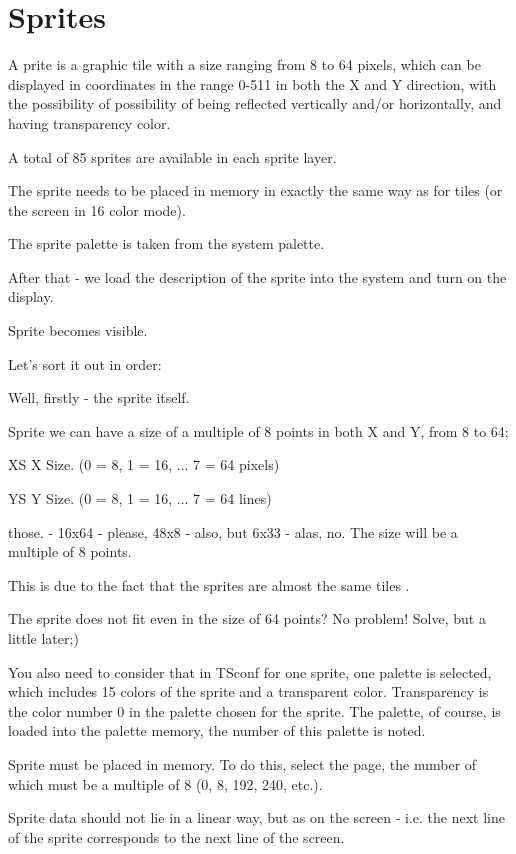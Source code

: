 \section{Sprites}

A prite is a graphic tile with a size ranging from 8 to 64 pixels,
which can be displayed in coordinates in the range 0-511 in both the X
and Y direction, with the possibility of possibility of being
reflected vertically and/or horizontally, and having transparency color.

A total of 85 sprites are available in each sprite layer.

The sprite needs to be placed in memory in exactly the same way as for
tiles (or the screen in 16 color mode).

The sprite palette is taken from the system palette.

After that - we load the description of the sprite into the system and
turn on the display.

Sprite becomes visible.

Let's sort it out in order: 

Well, firstly - the sprite itself. 

Sprite we can have a size of a multiple of 8 points in both X and Y,
from 8 to 64;

XS X Size. (0 = 8, 1 = 16, ... 7 = 64 pixels) 

YS Y Size. (0 = 8, 1 = 16, ... 7 = 64 lines)

those. - 16x64 - please, 48x8 - also, but 6x33 - alas, no. The size
will be a multiple of 8 points.

This is due to the fact that the sprites are almost the same tiles . 

The sprite does not fit even in the size of 64 points? No problem!
Solve, but a little later;)

You also need to consider that in TSconf for one sprite, one palette
is selected, which includes 15 colors of the sprite and a transparent
color. Transparency is the color number 0 in the palette chosen for
the sprite. The palette, of course, is loaded into the palette memory,
the number of this palette is noted.

Sprite must be placed in memory. To do this, select the page, the
number of which must be a multiple of 8 (0, 8, 192, 240, etc.).

Sprite data should not lie in a linear way, but as on the screen -
i.e. the next line of the sprite corresponds to the next line of the
screen.

